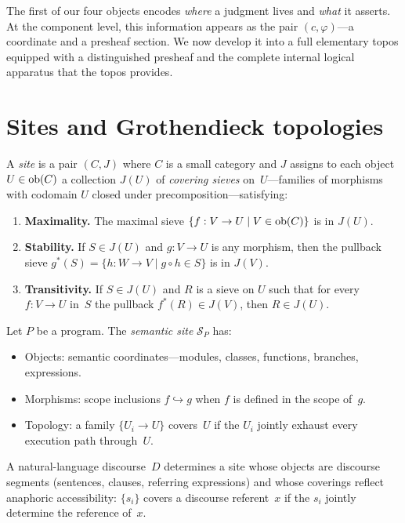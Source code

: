 The first of our four objects encodes \emph{where} a judgment lives and
\emph{what} it asserts.  At the component level, this information
appears as the pair $(c,\varphi)$---a coordinate and a presheaf
section.  We now develop it into a full elementary topos equipped with
a distinguished presheaf and the complete internal logical apparatus
that the topos provides.

\section{Sites and Grothendieck topologies}
\label{sec:sites}

\begin{definition}[Site]
\label{def:site}
A \emph{site} is a pair $(C,J)$ where $C$ is a small category and
$J$ assigns to each object $U \in \mathrm{ob}(C)$ a collection $J(U)$ of
\emph{covering sieves} on~$U$---families of morphisms with codomain
$U$ closed under precomposition---satisfying:
\begin{enumerate}[label=(\alph*),nosep]
\item \textbf{Maximality.}  The maximal sieve
  $\{f : V \to U \mid V \in \mathrm{ob}(C)\}$ is in $J(U)$.
\item \textbf{Stability.}  If $S \in J(U)$ and $g : V \to U$ is any
  morphism, then the pullback sieve
  $g^*(S) = \{h : W \to V \mid g \circ h \in S\}$ is in $J(V)$.
\item \textbf{Transitivity.}  If $S \in J(U)$ and $R$ is a sieve on
  $U$ such that for every $f : V \to U$ in~$S$ the pullback
  $f^*(R) \in J(V)$, then $R \in J(U)$.
\end{enumerate}
\end{definition}

\begin{example}
\label{ex:program-site}
Let $P$ be a program.  The \emph{semantic site} $\mathcal{S}_P$ has:
\begin{itemize}[nosep]
\item Objects: semantic coordinates---modules, classes, functions,
  branches, expressions.
\item Morphisms: scope inclusions $f \hookrightarrow g$ when $f$ is
  defined in the scope of~$g$.
\item Topology: a family $\{U_i \to U\}$ covers~$U$ if the $U_i$
  jointly exhaust every execution path through~$U$.
\end{itemize}
\end{example}

\begin{example}
\label{ex:discourse-site}
A natural-language discourse~$D$ determines a site whose objects are
discourse segments (sentences, clauses, referring expressions) and
whose coverings reflect anaphoric accessibility: $\{s_i\}$ covers a
discourse referent~$x$ if the $s_i$ jointly determine the reference
of~$x$.
\end{example}

